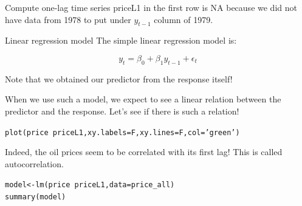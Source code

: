 \documentclass{beamer}\usepackage[]{graphicx}\usepackage[]{color}
\makeatletter
\newcommand{\hlstr}[1]{\textcolor[rgb]{1,0.894,0.71}{#1}}%
\newcommand{\hlopt}[1]{\textcolor[rgb]{1,0.894,0.769}{#1}}%
\newcommand{\hlstd}[1]{\textcolor[rgb]{1,0.894,0.769}{#1}}%
\newcommand{\hlkwb}[1]{\textcolor[rgb]{0.804,0.776,0.451}{#1}}%
\newcommand{\hlkwc}[1]{\textcolor[rgb]{0.78,0.941,0.545}{#1}}%
\newcommand{\hlkwd}[1]{\textcolor[rgb]{1,0.78,0.769}{#1}}%
\newenvironment{kframe}{%
 \def\at@end@of@kframe{}%
 \ifinner\ifhmode%
  \def\at@end@of@kframe{\end{minipage}}%
  \begin{minipage}{\columnwidth}%
 \fi\fi%
 \def\FrameCommand##1{\hskip\@totalleftmargin \hskip-\fboxsep
 \colorbox{shadecolor}{##1}\hskip-\fboxsep
     \hskip-\linewidth \hskip-\@totalleftmargin \hskip\columnwidth}%
 \MakeFramed {\advance\hsize-\width
   \@totalleftmargin\z@ \linewidth\hsize
   \@setminipage}}%
 {\par\unskip\endMakeFramed%
 \at@end@of@kframe}
\newenvironment{knitrout}{}{} %
\makeatother
\begin{document}
\begin{darkframes}
\begin{frame}[fragile]{Compute one-lag time series}
        priceL1 in the first row is NA because we did not have data from 1978 to put under $y_{t-1}$ column of 1979.
    \end{frame}
    
    
    
    
    \begin{frame}{Linear regression model}
      The simple linear regression model is:
      
      \begin{center} 
        \[
          y_t = \beta_0 + \beta_1 y_{t-1} + \epsilon_t
        \] 
      \end{center} \pause
      \bigskip
      
      Note that we obtained our predictor from the response itself!
    
    \end{frame}
    
    
    \begin{frame}[fragile]%
      \fontsize{8}{8}\selectfont
      When we use such a model, we expect to see a linear relation between the predictor and the response. Let's see if there is such a relation! \pause
\begin{knitrout}
\begin{kframe}
\begin{alltt}
\hlkwd{plot}\hlstd{(price} \hlopt{~} \hlstd{priceL1,} \hlkwc{xy.labels}\hlstd{=F,} \hlkwc{xy.lines}\hlstd{=F,} \hlkwc{col}\hlstd{=}\hlstr{'green'}\hlstd{)}
\end{alltt}
\end{kframe}


\end{knitrout}
      \pause
      Indeed, the oil prices seem to be correlated with its first lag! \pause This is called \alert{autocorrelation.}
      
    \end{frame}
    
    
    \begin{frame}[fragile]%
      \fontsize{8}{8}\selectfont
\begin{knitrout}
\begin{kframe}
\begin{alltt}
  \hlstd{model} \hlkwb{<-} \hlkwd{lm}\hlstd{(price} \hlopt{~} \hlstd{priceL1,} \hlkwc{data}\hlstd{=price_all)}
  \hlkwd{summary}\hlstd{(model)}
\end{alltt}
\begin{verbatim}


\end{verbatim}
\end{kframe}
\end{knitrout}
\end{frame}
\end{darkframes}
\end{document}
